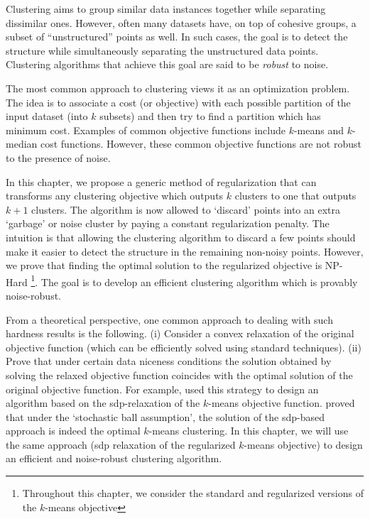 \documentclass[12pt]{article}
\begin{document}
\fi

Clustering aims to group similar data instances together while separating dissimilar ones. However, often many datasets have, on top of cohesive groups, a subset of ``unstructured'' points as well. In such cases, the goal is to detect the structure while simultaneously separating the unstructured data points. Clustering algorithms that achieve this goal are said to be {\em robust} to noise.

The most common approach to clustering views it as an optimization problem. The idea is to associate a cost (or objective) with each possible partition of the input dataset (into $k$ subsets) and then try to find a partition which has minimum cost. Examples of common objective functions include $k$-means and $k$-median cost functions. However, these common objective functions are not robust to the presence of noise.   

In this chapter, we propose a generic method of regularization that can transforms any clustering objective which outputs $k$ clusters to one that outputs $k+1$ clusters. The algorithm is now allowed to `discard' points into an extra `garbage' or noise cluster by paying a constant regularization penalty. The intuition is that allowing the clustering algorithm to discard a few points should make it easier to detect the structure in the remaining non-noisy points. However, we prove that finding the optimal solution to the regularized objective is NP-Hard \footnote{Throughout this chapter, we consider the standard and regularized versions of the $k$-means objective}. The goal is to develop an efficient clustering algorithm which is provably noise-robust.

From a theoretical perspective, one common approach to dealing with such hardness results is the following. (i) Consider a convex relaxation of the original objective function (which can be efficiently solved using standard techniques). (ii) Prove that under certain data niceness conditions the solution obtained by solving the relaxed objective function coincides with the optimal solution of the original objective function. For example, \cite{peng2007approximating} used this strategy to design an algorithm based on the sdp-relaxation of the $k$-means objective function. \cite{awasthi2015relax} proved that under the `stochastic ball assumption', the solution of the sdp-based approach is indeed the optimal $k$-means clustering. In this chapter, we will use the same approach (sdp relaxation of the regularized $k$-means objective) to design an efficient and noise-robust clustering algorithm.
\end{document}
